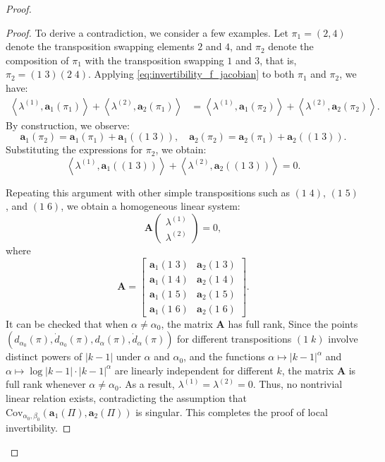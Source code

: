\documentclass{article}
\begin{document}
\begin{proof}
\begin{proof}
To derive a contradiction, we consider a few examples. Let \(\pi_1=(2,4)\) denote the transposition swapping elements \(2\) and \(4\), and \(\pi_2\) denote the composition of \(\pi_1\) with the transposition swapping \(1\) and \(3\), that is, \(\pi_2 = (1\;3)(2\;4)\).
Applying \eqref{eq:invertibility_f_jacobian} to both \(\pi_1\) and \(\pi_2\), we have:
\begin{align*}
\left\langle \lambda^{(1)}, \boldsymbol{a}_1(\pi_1) \right\rangle + \left\langle \lambda^{(2)}, \boldsymbol{a}_2(\pi_1) \right\rangle &= 
\left\langle \lambda^{(1)}, \boldsymbol{a}_1(\pi_2) \right\rangle + \left\langle \lambda^{(2)}, \boldsymbol{a}_2(\pi_2) \right\rangle.
\end{align*}
By construction, we observe:
\[
\boldsymbol{a}_1(\pi_2) = \boldsymbol{a}_1(\pi_1) + \boldsymbol{a}_1((1\;3)),
\quad
\boldsymbol{a}_2(\pi_2) = \boldsymbol{a}_2(\pi_1) + \boldsymbol{a}_2((1\;3)).
\]
Substituting the expressions for \(\pi_2\), we obtain:
\[
\left\langle \lambda^{(1)}, \boldsymbol{a}_1((1\;3)) \right\rangle
+
\left\langle \lambda^{(2)}, \boldsymbol{a}_2((1\;3)) \right\rangle
= 0.
\]

Repeating this argument with other simple transpositions such as \((1\;4)\), \((1\;5)\), and \((1\;6)\), we obtain a homogeneous linear system:
\[
\boldsymbol{A}
\begin{pmatrix}
\lambda^{(1)} \\ \lambda^{(2)}
\end{pmatrix}
= 0,
\]
where
\[
\boldsymbol{A}
=
\begin{bmatrix}
\boldsymbol{a}_1(1\;3) & \boldsymbol{a}_2(1\;3) \\
\boldsymbol{a}_1(1\;4) & \boldsymbol{a}_2(1\;4) \\
\boldsymbol{a}_1(1\;5) & \boldsymbol{a}_2(1\;5) \\
\boldsymbol{a}_1(1\;6) & \boldsymbol{a}_2(1\;6)
\end{bmatrix}.
\]
It can be checked that when \(\alpha \neq \alpha_0\), the matrix \(\boldsymbol{A}\) has full rank, 
Since the points \((d_{\alpha_0}(\pi), \dot{d}_{\alpha_0}(\pi), d_{\alpha}(\pi), \dot{d}_{\alpha}(\pi))\) for different transpositions \((1\;k)\) involve distinct powers of \(|k-1|\) under \(\alpha\) and \(\alpha_0\), and the functions \(\alpha \mapsto |k-1|^\alpha\) and \(\alpha \mapsto \log|k-1|\cdot |k-1|^\alpha\) are linearly independent for different \(k\), the matrix \(\boldsymbol{A}\) is full rank whenever \(\alpha \neq \alpha_0\).
As a result, \(\lambda^{(1)} = \lambda^{(2)} = 0\).
Thus, no nontrivial linear relation exists, contradicting the assumption that \(\mathrm{Cov}_{\alpha_0,\beta_0}(\boldsymbol{a}_1(\Pi), \boldsymbol{a}_2(\Pi))\) is singular. This completes the proof of local invertibility.
\end{proof}


\end{proof}
\end{document}
